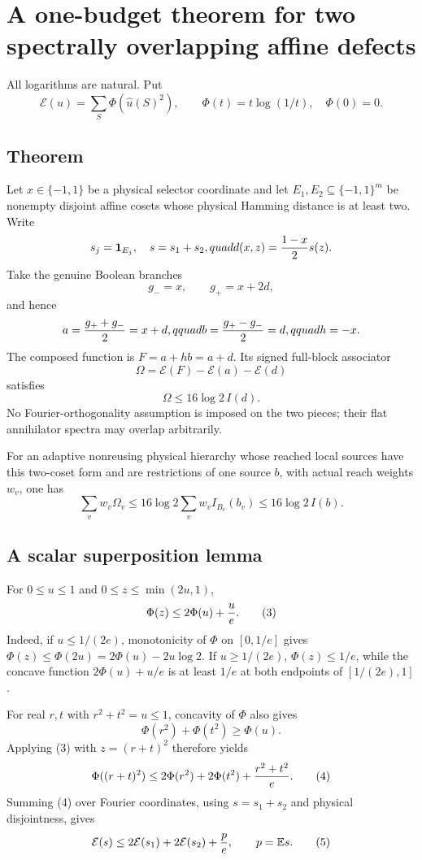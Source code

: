 \section*{A one-budget theorem for two spectrally overlapping affine defects}

All logarithms are natural.  Put
\[
 \mathcal E(u)=\sum_S\Phi(\widehat u(S)^2),\qquad
 \Phi(t)=t\log(1/t),\quad\Phi(0)=0.
\]

\subsection*{Theorem}
Let $x\in\{-1,1\}$ be a physical selector coordinate and let
$E_1,E_2\subseteq\{-1,1\}^m$ be nonempty disjoint affine cosets whose
physical Hamming distance is at least two.  Write
\[
 s_j=\mathbf1_{E_j},\quad s=s_1+s_2,quad
 d(x,z)={1-x\over2}s(z).
\]
Take the genuine Boolean branches
\[
 g_-=x,\qquad g_+=x+2d,
\]
and hence
\[
 a={g_++g_-\over2}=x+d,qquad b={g_+-g_-\over2}=d,qquad h=-x.
\]
The composed function is $F=a+hb=a+d$.  Its signed full-block associator
\[
 \Omega=\mathcal E(F)-\mathcal E(a)-\mathcal E(d)
\]
satisfies
\[
 \boxed{\ \Omega\leq16\log2\,I(d).\ }                       \tag{1}
\]
No Fourier-orthogonality assumption is imposed on the two pieces; their flat
annihilator spectra may overlap arbitrarily.

For an adaptive nonreusing physical hierarchy whose reached local sources
have this two-coset form and are restrictions of one source $b$, with actual
reach weights $w_v$, one has
\[
 \sum_vw_v\Omega_v\leq16\log2\sum_vw_vI_{B_v}(b_v)
 \leq16\log2\,I(b).                                         \tag{2}
\]

\subsection*{A scalar superposition lemma}
For $0\leq u\leq1$ and $0\leq z\leq\min(2u,1)$,
\[
 \Phi(z)\leq2\Phi(u)+{u\over e}.                            \tag{3}
\]
Indeed, if $u\leq1/(2e)$, monotonicity of $\Phi$ on $[0,1/e]$ gives
$\Phi(z)\leq\Phi(2u)=2\Phi(u)-2u\log2$.  If $u\geq1/(2e)$,
$\Phi(z)\leq1/e$, while the concave function
$2\Phi(u)+u/e$ is at least $1/e$ at both endpoints of
$[1/(2e),1]$.

For real $r,t$ with $r^2+t^2=u\leq1$, concavity of $\Phi$ also gives
\[
 \Phi(r^2)+\Phi(t^2)\geq\Phi(u).
\]
Applying (3) with $z=(r+t)^2$ therefore yields
\[
 \Phi((r+t)^2)
 \leq2\Phi(r^2)+2\Phi(t^2)+{r^2+t^2\over e}.                \tag{4}
\]
Summing (4) over Fourier coordinates, using $s=s_1+s_2$ and physical
disjointness, gives
\[
 \mathcal E(s)\leq2\mathcal E(s_1)+2\mathcal E(s_2)+{p\over e},
 \qquad p=\mathbb E s.                                      \tag{5}
\]

